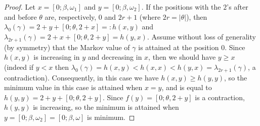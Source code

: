 \documentclass[10pt,a4paper]{amsart}
\begin{document}
\begin{proof} Let $x=[0;\beta,\omega_1]$ and $y=[0;\beta,\omega_2]$. If the positions with the $2$'s after and before $\theta$ are, respectively, $0$ and $2r+1$ (where $2r=|\theta|$), then $\lambda_0(\gamma)=2+y+[0;\theta,2+x]=:h(x,y)$ and $\lambda_{2r+1}(\gamma)=2+x+[0;\theta,2+y]=h(y,x)$. Assume without loss of generality (by symmetry) that the Markov value of $\gamma$ is attained at the position $0$. Since $h(x,y)$ is increasing in $y$ and decreasing in $x$, then we should have $y\ge x$ (indeed if $y<x$ then $\lambda_0(\gamma)=h(x,y)<h(x,x)<h(y,x)=\lambda_{2r+1}(\gamma)$, a contradiction). 
Consequently, in this case we have $h(x,y)\ge h(y,y)$, so the minimum value in this case is attained when $x=y$, and is equal to $h(y,y)=2+y+[0;\theta,2+y]$. Since $f(y)=[0;\theta,2+y]$ is a contraction, $h(y,y)$ is increasing, so the minimum is attained when $y=[0;\beta,\omega_2]=[0;\beta,\omega]$ is minimum. 
\end{proof} 
\end{document}
